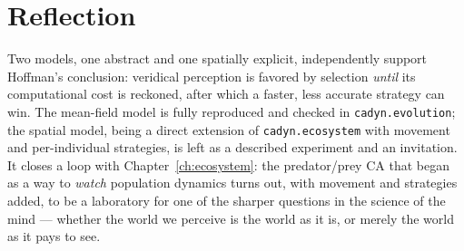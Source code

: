 \section{Reflection}

Two models, one abstract and one spatially explicit, independently
support Hoffman's conclusion: veridical perception is favored by
selection \emph{until} its computational cost is reckoned, after which a
faster, less accurate strategy can win.  The mean-field model is fully
reproduced and checked in \texttt{cadyn.evolution}; the spatial model,
being a direct extension of \texttt{cadyn.ecosystem} with movement and
per-individual strategies, is left as a described experiment and an
invitation.  It closes a loop with Chapter~\ref{ch:ecosystem}: the
predator/prey CA that began as a way to \emph{watch} population dynamics
turns out, with movement and strategies added, to be a laboratory for one
of the sharper questions in the science of the mind --- whether the world
we perceive is the world as it is, or merely the world as it pays to see.
